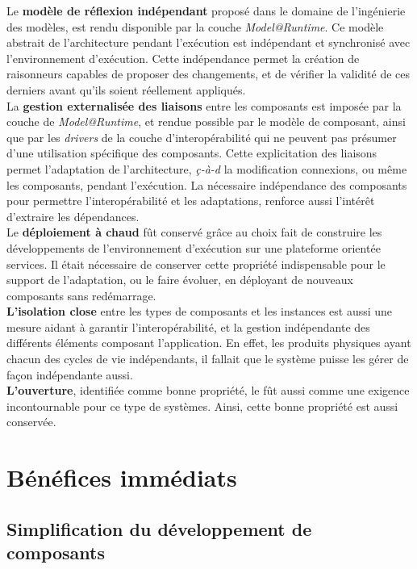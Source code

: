 Le {\bf modèle de réflexion indépendant} proposé dans le domaine de l'ingénierie des modèles, est rendu disponible par la couche {\it Model@Runtime}. Ce modèle abstrait de l'architecture pendant l'exécution est indépendant et synchronisé avec l'environnement d'exécution. Cette indépendance permet la création de raisonneurs capables de proposer des changements, et de vérifier la validité de ces derniers avant qu'ils soient réellement appliqués.\\
La {\bf gestion externalisée des liaisons} entre les composants est imposée par la couche de \textit{Model@Runtime}, et rendue possible par le modèle de composant, ainsi que par les \textit{drivers} de la couche d'interopérabilité qui ne peuvent pas présumer d'une utilisation spécifique des composants. Cette explicitation des liaisons permet l'adaptation de l'architecture, \emph{ç-à-d} la modification connexions, ou même les composants, pendant l'exécution. La nécessaire indépendance des composants pour permettre l'interopérabilité et les adaptations, renforce aussi l'intér\^et d'extraire les dépendances.\\
Le {\bf déploiement à chaud} fût conservé grâce au choix fait de construire les développements de l'environnement d'exécution sur une plateforme orientée services. Il était nécessaire de conserver cette propriété indispensable pour le support de l'adaptation, ou le faire évoluer, en déployant de nouveaux composants sans redémarrage.\\
{\bf L'isolation close} entre les types de composants et les instances est aussi une mesure aidant à garantir l'interopérabilité, et la gestion indépendante des différents éléments composant l'application. En effet, les produits physiques ayant chacun des cycles de vie indépendants, il fallait que le système puisse les gérer de façon indépendante aussi.\\
{\bf L'ouverture}, identifiée comme bonne propriété, le fût aussi comme une exigence incontournable pour ce type de systèmes. Ainsi, cette bonne propriété est aussi conservée.

\section{Bénéfices immédiats}

\subsection{Simplification du développement de composants}

